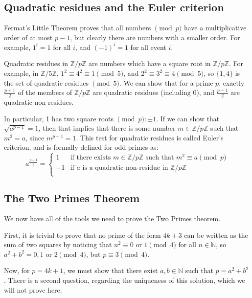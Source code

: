 \documentclass{article}
\begin{document}
\subsection{Quadratic residues and the Euler criterion}

Fermat's Little Theorem proves that all numbers $\pmod{p}$ have a multiplicative order of at
most $p-1$, but clearly there are numbers with a smaller order. For example, $1^i = 1$ for all
$i$, and $(-1)^i = 1$ for all event $i$.

Quadratic residues in $\mathbb{Z}/p\mathbb{Z}$ are numbers which have a square root in
$\mathbb{Z}/p\mathbb{Z}$. For example, in $\mathbb{Z}/5\mathbb{Z}$, $1^2 \equiv 4^2 \equiv 1
\pmod{5}$, and $2^2 \equiv 3^2 \equiv 4 \pmod{5}$, so $\{1,4\}$ is the set of quadratic residues
$\pmod{5}$. We can show that for a prime $p$, exactly $\frac{p+1}{2}$ of the members of
$\mathbb{Z}/p\mathbb{Z}$ are quadratic residues (including 0), and $\frac{p-1}{2}$ are quadratic
non-residues.

In particular, 1 has two square roots $\pmod{p}: \pm 1$. If we can show that $\sqrt{a^{p-1}} = 1$,
then that implies that there is some number $m \in \mathbb{Z}/p\mathbb{Z}$ such that $m^2 = a$,
since $m^{p-1} = 1$. This test for quadratic residues is called Euler's criterion, and is formally
defined for odd primes as:
\[a^{\frac{p-1}{2}} =
\left\{
	\begin{array}{ll}
		1  & \mbox{if there exists } m \in \mathbb{Z}/p\mathbb{Z} \mbox{ such that } m^2 \equiv a \pmod{p} \\
		-1  & \mbox{if } a \mbox{ is a quadratic non-residue in } \mathbb{Z}/p\mathbb{Z} \\
	\end{array}
\right. \]

\subsection{The Two Primes Theorem}

We now have all of the tools we need to prove the Two Primes theorem.

First, it is trivial to prove that no prime of the form $4k+3$ can be written as the sum of two
squares by noticing that $n^2 \equiv 0 \mbox{ or } 1 \pmod{4}$ for all $n\in \mathbb{N}$, so 
$a^2+b^2 = 0,1 \mbox{ or } 2 \pmod{4}$, but $p \equiv 3 \pmod{4}$.

Now, for $p=4k+1$, we must show that there exist $a,b \in \mathbb{N}$ such that $p=a^2+b^2$. There
is a second question, regarding the uniqueness of this solution, which we will not prove here.
\end{document}
